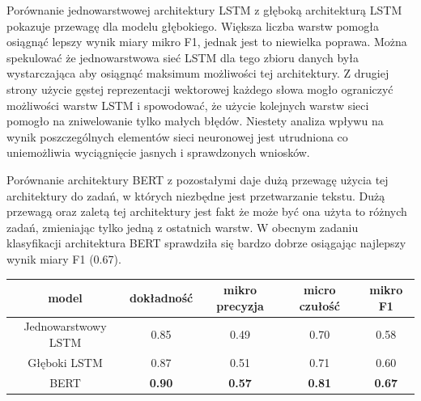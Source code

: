 Porównanie jednowarstwowej architektury LSTM  z głęboką architekturą LSTM pokazuje przewagę dla modelu głębokiego. Większa liczba warstw pomogła osiągnąć lepszy wynik miary mikro F1, jednak jest to niewielka poprawa. Można spekulować że jednowarstwowa sieć LSTM dla tego zbioru danych była wystarczająca aby osiągnąć maksimum możliwości tej architektury. Z drugiej strony użycie gęstej reprezentacji wektorowej każdego słowa mogło ograniczyć możliwości warstw LSTM i spowodować, że użycie kolejnych warstw sieci pomogło na zniwelowanie tylko małych błędów. Niestety analiza wpływu na wynik poszczególnych elementów sieci neuronowej jest utrudniona co uniemożliwia wyciągnięcie jasnych i sprawdzonych wniosków.

Porównanie architektury BERT z pozostałymi daje dużą przewagę użycia tej architektury do zadań, w których niezbędne jest przetwarzanie tekstu. Dużą przewagą oraz zaletą tej architektury jest fakt że może być ona użyta to różnych zadań, zmieniając tylko jedną z ostatnich warstw. W obecnym zadaniu klasyfikacji architektura BERT sprawdziła się bardzo dobrze osiągając najlepszy wynik miary F1 (0.67).  

\begin{table}[ht]
\label{tab:tabela_results}
\centering\footnotesize%
\begin{tabular}{c c c c c}
\toprule
model & dokładność & mikro precyzja & micro czułość & \textbf{mikro F1} \\
\midrule
Jednowarstwowy LSTM & 0.85 & 0.49 & 0.70 & 0.58 \\
Głęboki LSTM & 0.87 & 0.51 & 0.71 & 0.60 \\
BERT & \textbf{0.90} & \textbf{0.57} & \textbf{0.81} & \textbf{0.67} \\
\bottomrule
\end{tabular}
\end{table}